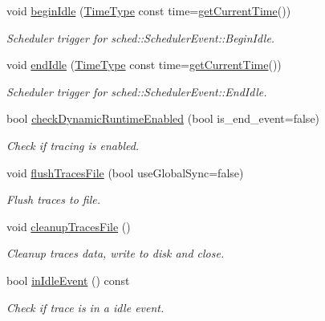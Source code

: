 \begin{DoxyCompactItemize}
void \hyperlink{structvt_1_1trace_1_1_trace_lite_af6c182ffc1b51c64e94a53787a2fc8e7}{begin\+Idle} (\hyperlink{namespacevt_a2b9f28078dc309ad0706b69ded743e69}{Time\+Type} const time=\hyperlink{structvt_1_1trace_1_1_trace_lite_a5ddfc40d8206946d33630d4b81b6126c}{get\+Current\+Time}())
\begin{DoxyCompactList}\small\item\em Scheduler trigger for {\ttfamily sched\+::\+Scheduler\+Event\+::\+Begin\+Idle}. \end{DoxyCompactList}\item 
void \hyperlink{structvt_1_1trace_1_1_trace_lite_a7db54aece996aa01a4ee583f0ec919f1}{end\+Idle} (\hyperlink{namespacevt_a2b9f28078dc309ad0706b69ded743e69}{Time\+Type} const time=\hyperlink{structvt_1_1trace_1_1_trace_lite_a5ddfc40d8206946d33630d4b81b6126c}{get\+Current\+Time}())
\begin{DoxyCompactList}\small\item\em Scheduler trigger for {\ttfamily sched\+::\+Scheduler\+Event\+::\+End\+Idle}. \end{DoxyCompactList}\item 
bool \hyperlink{structvt_1_1trace_1_1_trace_lite_a8c80920e23cef1aeedbb2282fb6769f2}{check\+Dynamic\+Runtime\+Enabled} (bool is\+\_\+end\+\_\+event=false)
\begin{DoxyCompactList}\small\item\em Check if tracing is enabled. \end{DoxyCompactList}\item 
void \hyperlink{structvt_1_1trace_1_1_trace_lite_a31513ed82d3b3c74369fde81491eb3a2}{flush\+Traces\+File} (bool use\+Global\+Sync=false)
\begin{DoxyCompactList}\small\item\em Flush traces to file. \end{DoxyCompactList}\item 
void \hyperlink{structvt_1_1trace_1_1_trace_lite_ac412f235b5e5b4510d848fa0b3b6a539}{cleanup\+Traces\+File} ()
\begin{DoxyCompactList}\small\item\em Cleanup traces data, write to disk and close. \end{DoxyCompactList}\item 
bool \hyperlink{structvt_1_1trace_1_1_trace_lite_ad3b81920d008e46dff0eb205ca99bd22}{in\+Idle\+Event} () const
\begin{DoxyCompactList}\small\item\em Check if trace is in a idle event. \end{DoxyCompactList}\item 

\end{DoxyCompactItemize}
